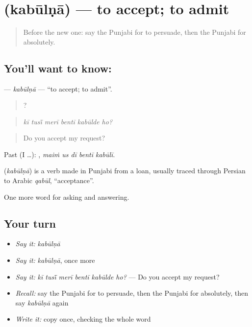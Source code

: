 \section[\texorpdfstring{\pa{ਕਬੂਲਣਾ} (kabūlṇā)}{ਕਬੂਲਣਾ (kabūlṇā)}]{ (kabūlṇā) — to accept; to admit}

\label{lesson:PA-C340-kabulna}



\begin{quote}
Before the new one: say the Punjabi for to persuade, then the Punjabi for absolutely.
\end{quote}

\subsection*{You'll want to know: }
\textbf{} — \emph{kabūlṇā} — \textquotedblleft{}to accept; to admit\textquotedblright{}.

\begin{quote}
     ?
\end{quote}

\begin{quote}
\emph{kī tusī̃ merī bentī kabūlde ho?}
\end{quote}

\begin{quote}
Do you accept my request?
\end{quote}

Past (I …):     , \emph{maiṁ us dī bentī kabūlī}.

\begin{cousinweb}
\textbf{} (\emph{kabūlṇā}) is a verb made in Punjabi from a loan, usually traced through Persian to Arabic \emph{qabūl}, \textquotedblleft{}acceptance\textquotedblright{}.
\end{cousinweb}

\begin{grammarlens}[title={What you've built}]
One more word for asking and answering.
\end{grammarlens}

\subsection*{Your turn}
\begin{itemize}
\raggedright
  \item \emph{Say it:} \emph{kabūlṇā}
  \item \emph{Say it:} \emph{kabūlṇā}, once more
  \item \emph{Say it:} \emph{kī tusī̃ merī bentī kabūlde ho?} — Do you accept my request?
  \item \emph{Recall:} say the Punjabi for to persuade, then the Punjabi for absolutely, then say \emph{kabūlṇā} again
  \item \emph{Write it:} copy \textbf{} once, checking the whole word
\end{itemize}

